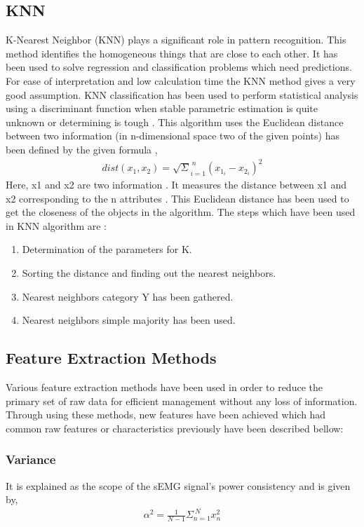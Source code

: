 \documentclass[conference]{IEEEtran}
\begin{document}
\subsection{KNN}\label{BB}
K-Nearest Neighbor (KNN) plays a significant role in pattern recognition. This method identifies
the homogeneous things that are close to each other. It has been used to solve regression and
classification problems which need predictions. For ease of interpretation and low calculation time 
the KNN method gives a very good assumption. KNN classification has been used to perform statistical
analysis using a discriminant function when stable parametric estimation is quite unknown or
determining is tough \cite{inproceedings}.
This algorithm uses the Euclidean distance between two information (in n-dimensional space two
of the given points) has been defined by the given formula \cite{inproceedings},
\begin{align}
dist(x_1,x_2)=\surd\Sigma_{i=1}^{\ n}(x_1_i-x_2_i)^2
\end{align}
Here, x1 and x2 are two information 
 \cite{inproceedings}. It
measures the distance between x1 and x2 corresponding to the n attributes 
 \cite{inproceedings}. This Euclidean distance has been used to get the closeness of the objects in the algorithm. The steps which have been used in KNN
algorithm are \cite{inproceedings}:
\begin{enumerate}
    \item Determination of the parameters for K.
    \item Sorting the distance and finding out the nearest neighbors.
    \item Nearest neighbors category Y has been gathered.
    \item Nearest neighbors simple majority has been used.
\end{enumerate}
\subsection{Feature Extraction Methods}
Various feature extraction methods have been used in order to reduce the primary set of raw data for efficient management without any loss of information. Through using these methods, new features have been achieved which had common raw features or characteristics previously have been described bellow:
\subsubsection{Variance}\label{BB}
 It is explained as the scope of the sEMG signal's power consistency and is given by,~\cite{7428468}
\begin{align}
    \alpha^2=\frac{1}{N-1} \Sigma_{n=1}^{\ N} x_{n}^{2}   
\end{align}
\end{document}
